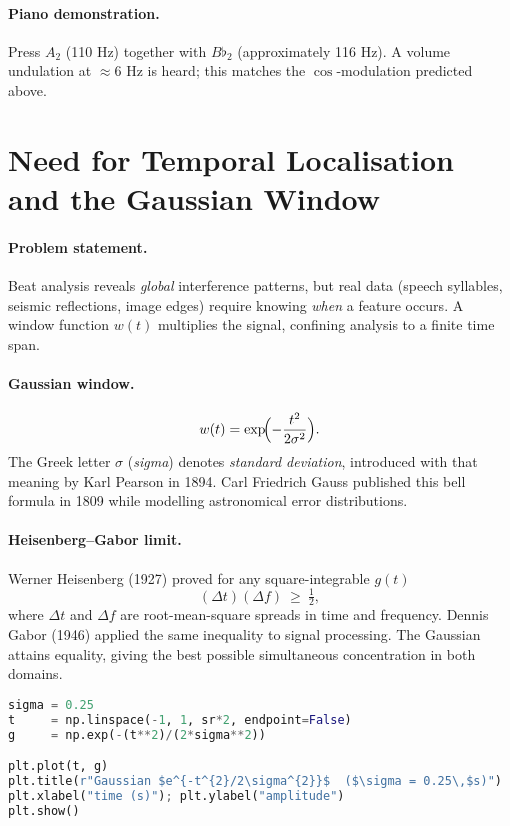 \documentclass[11pt]{article}
\begin{document}
\paragraph{Piano demonstration.}
Press \(A_2\) (110 Hz) together with \(B\flat_2\) (approximately 116 Hz).
A volume undulation at \(\approx 6\) Hz is heard; this matches the
\(\cos\)-modulation predicted above.

\section{Need for Temporal Localisation and the Gaussian Window}

\paragraph{Problem statement.}
Beat analysis reveals \emph{global} interference patterns, but real data
(speech syllables, seismic reflections, image edges) require knowing
\emph{when} a feature occurs.  A window function \(w(t)\) multiplies the
signal, confining analysis to a finite time span.

\paragraph{Gaussian window.}
\[
w(t)=\exp\!\Bigl(-\frac{t^{2}}{2\sigma^{2}}\Bigr).
\]
The Greek letter \( \sigma \) (\emph{sigma}) denotes \emph{standard
deviation}, introduced with that meaning by Karl Pearson in 1894.  Carl
Friedrich Gauss published this bell formula in 1809 while modelling
astronomical error distributions.

\paragraph{Heisenberg–Gabor limit.}
Werner Heisenberg (1927) proved for any square-integrable \(g(t)\)
\[
(\Delta t)(\Delta f)\ \ge\ \tfrac12,
\]
where \(\Delta t\) and \(\Delta f\) are root-mean-square spreads in time
and frequency.  Dennis Gabor (1946) applied the same inequality to signal
processing.  The Gaussian attains equality, giving the best possible
simultaneous concentration in both domains.

\begin{lstlisting}[language=Python,caption={Plot of Gaussian window with σ = 0.25 s}]
sigma = 0.25
t     = np.linspace(-1, 1, sr*2, endpoint=False)
g     = np.exp(-(t**2)/(2*sigma**2))

plt.plot(t, g)
plt.title(r"Gaussian $e^{-t^{2}/2\sigma^{2}}$  ($\sigma = 0.25\,$s)")
plt.xlabel("time (s)"); plt.ylabel("amplitude")
plt.show()
\end{lstlisting}
\end{document}
